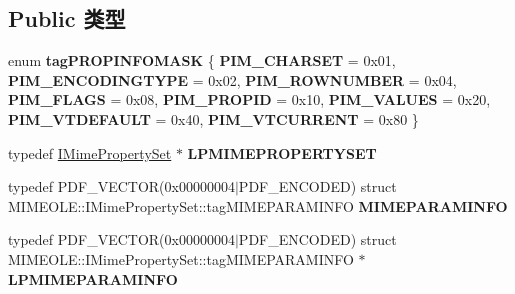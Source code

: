 \subsection*{Public 类型}
\begin{DoxyCompactItemize}
\item 
\mbox{\label{interface_m_i_m_e_o_l_e_1_1_i_mime_property_set_a4a0e9e9a532eb7ecbb93ac58c902fa83}} 
enum {\bfseries tag\+P\+R\+O\+P\+I\+N\+F\+O\+M\+A\+SK} \{ \newline
{\bfseries P\+I\+M\+\_\+\+C\+H\+A\+R\+S\+ET} = 0x01, 
{\bfseries P\+I\+M\+\_\+\+E\+N\+C\+O\+D\+I\+N\+G\+T\+Y\+PE} = 0x02, 
{\bfseries P\+I\+M\+\_\+\+R\+O\+W\+N\+U\+M\+B\+ER} = 0x04, 
{\bfseries P\+I\+M\+\_\+\+F\+L\+A\+GS} = 0x08, 
\newline
{\bfseries P\+I\+M\+\_\+\+P\+R\+O\+P\+ID} = 0x10, 
{\bfseries P\+I\+M\+\_\+\+V\+A\+L\+U\+ES} = 0x20, 
{\bfseries P\+I\+M\+\_\+\+V\+T\+D\+E\+F\+A\+U\+LT} = 0x40, 
{\bfseries P\+I\+M\+\_\+\+V\+T\+C\+U\+R\+R\+E\+NT} = 0x80
 \}
\item 
\mbox{\label{interface_m_i_m_e_o_l_e_1_1_i_mime_property_set_a6fb81857497c0445ee72963b7a8cdad2}} 
typedef \hyperlink{interface_m_i_m_e_o_l_e_1_1_i_mime_property_set}{I\+Mime\+Property\+Set} $\ast$ {\bfseries L\+P\+M\+I\+M\+E\+P\+R\+O\+P\+E\+R\+T\+Y\+S\+ET}
\item 
\mbox{\label{interface_m_i_m_e_o_l_e_1_1_i_mime_property_set_ae9a624dc4a0ec406af0622aeaf46d6b4}} 
typedef P\+D\+F\+\_\+\+V\+E\+C\+T\+OR(0x00000004$\vert$\+P\+D\+F\+\_\+\+E\+N\+C\+O\+D\+E\+D) struct M\+I\+M\+E\+O\+L\+E\+::\+I\+Mime\+Property\+Set\+::tag\+M\+I\+M\+E\+P\+A\+R\+A\+M\+I\+N\+FO {\bfseries M\+I\+M\+E\+P\+A\+R\+A\+M\+I\+N\+FO}
\item 
\mbox{\label{interface_m_i_m_e_o_l_e_1_1_i_mime_property_set_addee59874ccf8f9a3f3db2d1fa91f27b}} 
typedef P\+D\+F\+\_\+\+V\+E\+C\+T\+OR(0x00000004$\vert$\+P\+D\+F\+\_\+\+E\+N\+C\+O\+D\+E\+D) struct M\+I\+M\+E\+O\+L\+E\+::\+I\+Mime\+Property\+Set\+::tag\+M\+I\+M\+E\+P\+A\+R\+A\+M\+I\+N\+F\+O $\ast$ {\bfseries L\+P\+M\+I\+M\+E\+P\+A\+R\+A\+M\+I\+N\+FO}
\item 
\mbox{\label{interface_m_i_m_e_o_l_e_1_1_i_mime_property_set_aa4f03d3bce9c6e3038e766cb07d1875d}} 

\end{DoxyCompactItemize}
